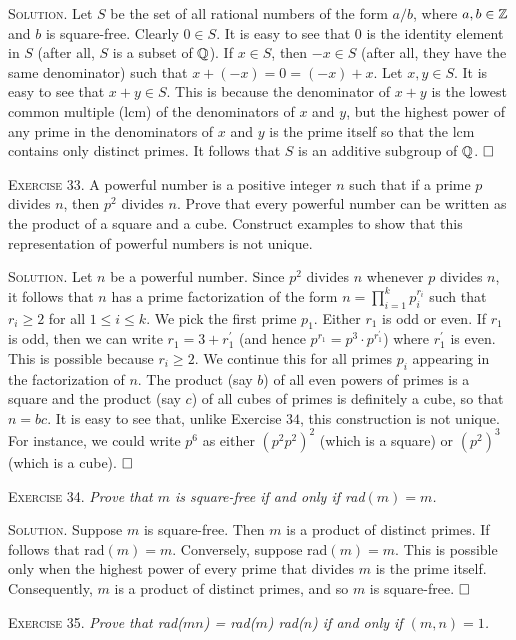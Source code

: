 \documentclass[11pt, leqno]{article}
\newcommand{\done}{\ensuremath{\hfill\square}}
\begin{document}
\textsc{Solution}. Let $S$ be the set of all rational numbers of the form $a/b$, where $a, b \in \mathbb{Z}$ and $b$ is square-free. Clearly $0 \in S$. It is easy to see that $0$ is the identity element in $S$ (after all, $S$ is a subset of $\mathbb{Q}$). If $x \in S$, then $-x \in S$ (after all, they have the same denominator) such that $x + (-x) = 0 = (-x) + x$. Let $x,y \in S$. It is easy to see that $x+y \in S$. This is because the denominator of $x+y$ is the lowest common multiple (lcm) of the denominators of $x$ and $y$, but the highest power of any prime in the denominators of $x$ and $y$ is the prime itself so that the lcm contains only distinct primes. It follows that $S$ is an additive subgroup of $\mathbb{Q}$. \done

\textsc{Exercise 33}. A powerful number is a positive integer $n$ such that if a prime $p$ divides $n$, then $p^2$ divides $n$. Prove that every powerful number can be written as the product of a square and a cube. Construct examples to show that this representation of powerful numbers is not unique.

\textsc{Solution}. Let $n$ be a powerful number. Since $p^2$ divides $n$ whenever $p$ divides $n$, it follows that $n$ has a prime factorization of the form $n = \prod_{i=1}^k p_i^{r_i}$ such that $r_i \geq 2$ for all $1 \leq i \leq k$. We pick the first prime $p_1$. Either $r_1$ is odd or even. If $r_1$ is odd, then we can write $r_1 = 3 + r_1^{\prime}$ (and hence $p^{r_1} = p^3\cdot p^{r_1^{\prime}}$) where $r_1^{\prime}$ is even. This is possible because $r_i \geq 2$. We continue this for all primes $p_i$ appearing in the factorization of $n$. The product (say $b$) of all even powers of primes is a square and the product (say $c$) of all cubes of primes is definitely a cube, so that $n = bc$. It is easy to see that, unlike Exercise $34$, this construction is not unique. For instance, we could write $p^6$ as either $(p^2p^2)^2$ (which is a square) or $(p^2)^3$ (which is a cube). \done

\textsc{Exercise 34}. \emph{Prove that $m$ is square-free if and only if \emph{rad}$(m) = m$.}

\textsc{Solution}. Suppose $m$ is square-free. Then $m$ is a product of distinct primes. If follows that rad$(m) = m$. Conversely, suppose rad$(m) = m$. This is possible only when the highest power of every prime that divides $m$ is the prime itself. Consequently, $m$ is a product of distinct primes, and so $m$ is square-free. \done

\textsc{Exercise 35}. \emph{Prove that \emph{rad($mn$)} = \emph{rad($m$)} \emph{rad($n$)} if and only if $(m, n) = 1$.}
\end{document}
